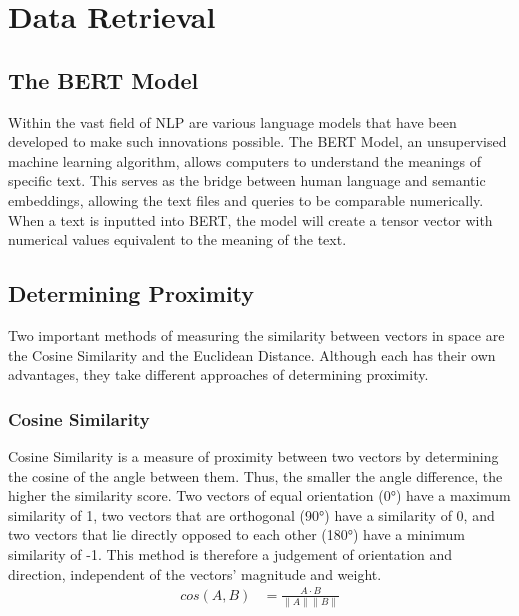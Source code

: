 \documentclass[11pt, a4paper, twocolumn]{article}
\begin{document}
\section{\Large{Data Retrieval}}

\subsection{The BERT Model} 
Within the vast field of NLP are various language models that have been developed to make such innovations possible. The BERT Model, an unsupervised machine learning algorithm, allows computers to understand the meanings of specific text. This serves as the bridge between human language and semantic embeddings, allowing the text files and queries to be comparable numerically. When a text is inputted into BERT, the model will create a tensor vector with numerical values equivalent to the meaning of the text.
\subsection{Determining Proximity} 
Two important methods of measuring the similarity between vectors in space are the Cosine Similarity and the Euclidean Distance. Although each has their own advantages, they take different approaches of determining proximity.
\subsubsection{Cosine Similarity}
Cosine Similarity is a measure of proximity between two vectors by determining the cosine of the angle between them. Thus, the smaller the angle difference, the higher the similarity score. Two vectors of equal orientation (0°) have a maximum similarity of 1, two vectors that are orthogonal (90°) have a similarity of 0, and two vectors that lie directly opposed to each other (180°) have a minimum similarity of -1. This method is therefore a judgement of orientation and direction, independent of the vectors' magnitude and weight. 
\begin{align} 
\label{cos}
cos(A,B) &= \frac{A\cdot B}{\|A\| \|B\|}\nonumber
\end{align}
\end{document}
